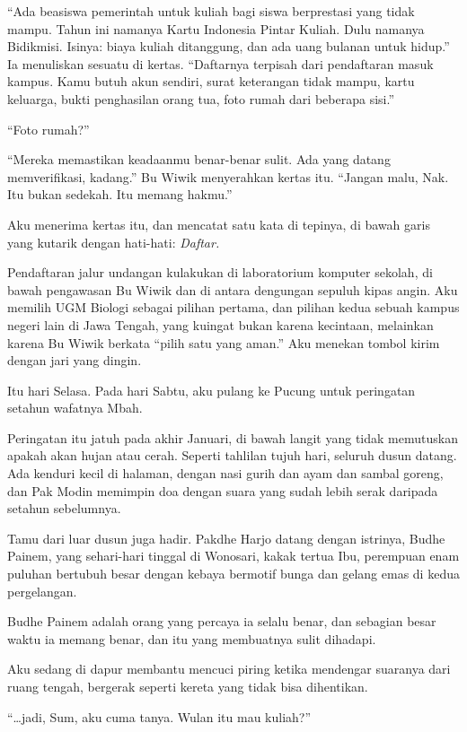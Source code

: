 \documentclass[11pt,twoside,openany]{book}
\makeatletter
\newcommand{\scenebreak}{\par\vspace{0.9em}{\centering\textsc{*\hspace{0.7em}*\hspace{0.7em}*}\par}\vspace{0.9em}\@afterindentfalse\@afterheading}
\makeatother
\begin{document}
``Ada beasiswa pemerintah untuk kuliah bagi siswa berprestasi yang tidak mampu. Tahun ini namanya Kartu Indonesia Pintar Kuliah. Dulu namanya Bidikmisi. Isinya: biaya kuliah ditanggung, dan ada uang bulanan untuk hidup.'' Ia menuliskan sesuatu di kertas. ``Daftarnya terpisah dari pendaftaran masuk kampus. Kamu butuh akun sendiri, surat keterangan tidak mampu, kartu keluarga, bukti penghasilan orang tua, foto rumah dari beberapa sisi.''

``Foto rumah?''

``Mereka memastikan keadaanmu benar-benar sulit. Ada yang datang memverifikasi, kadang.'' Bu Wiwik menyerahkan kertas itu. ``Jangan malu, Nak. Itu bukan sedekah. Itu memang hakmu.''

Aku menerima kertas itu, dan mencatat satu kata di tepinya, di bawah garis yang kutarik dengan hati-hati: \emph{Daftar.}

\scenebreak
Pendaftaran jalur undangan kulakukan di laboratorium komputer sekolah, di bawah pengawasan Bu Wiwik dan di antara dengungan sepuluh kipas angin. Aku memilih UGM Biologi sebagai pilihan pertama, dan pilihan kedua sebuah kampus negeri lain di Jawa Tengah, yang kuingat bukan karena kecintaan, melainkan karena Bu Wiwik berkata ``pilih satu yang aman.'' Aku menekan tombol kirim dengan jari yang dingin.

Itu hari Selasa. Pada hari Sabtu, aku pulang ke Pucung untuk peringatan setahun wafatnya Mbah.

\scenebreak
Peringatan itu jatuh pada akhir Januari, di bawah langit yang tidak memutuskan apakah akan hujan atau cerah. Seperti tahlilan tujuh hari, seluruh dusun datang. Ada kenduri kecil di halaman, dengan nasi gurih dan ayam dan sambal goreng, dan Pak Modin memimpin doa dengan suara yang sudah lebih serak daripada setahun sebelumnya.

Tamu dari luar dusun juga hadir. Pakdhe Harjo datang dengan istrinya, Budhe Painem, yang sehari-hari tinggal di Wonosari, kakak tertua Ibu, perempuan enam puluhan bertubuh besar dengan kebaya bermotif bunga dan gelang emas di kedua pergelangan.

Budhe Painem adalah orang yang percaya ia selalu benar, dan sebagian besar waktu ia memang benar, dan itu yang membuatnya sulit dihadapi.

Aku sedang di dapur membantu mencuci piring ketika mendengar suaranya dari ruang tengah, bergerak seperti kereta yang tidak bisa dihentikan.

``\ldots jadi, Sum, aku cuma tanya. Wulan itu mau kuliah?''
\end{document}
